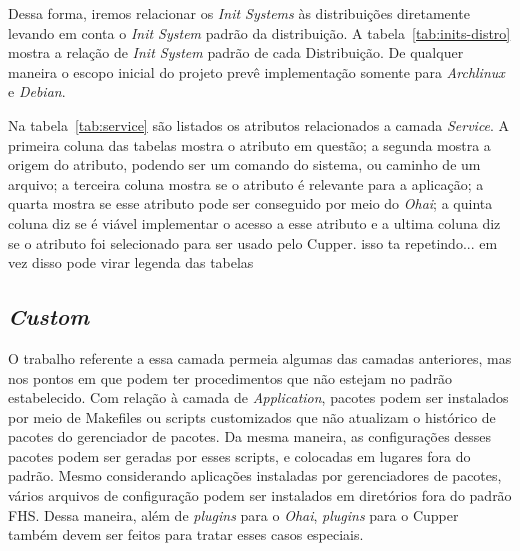 Dessa forma, iremos relacionar os \textit{Init Systems} às distribuições
diretamente levando em conta o \textit{Init System} padrão da distribuição.
A tabela~\ref{tab:inits-distro} mostra a relação de \textit{Init System} padrão de cada 
Distribuição. De qualquer maneira o escopo inicial do projeto prevê
implementação somente para \textit{Archlinux} e \textit{Debian}.


Na tabela~\ref{tab:service} são listados os atributos relacionados a camada 
\textit{Service}. A primeira coluna das tabelas mostra o atributo em questão; a segunda mostra
a origem do atributo, podendo ser um comando do sistema, ou caminho de um arquivo;
a terceira coluna mostra se o atributo é relevante para a aplicação; a quarta mostra se
esse atributo pode ser conseguido por meio do \textit{Ohai}; a quinta coluna 
diz se é viável implementar o acesso a esse atributo e a ultima coluna
diz se o atributo foi selecionado para ser usado pelo Cupper. {\color{red} isso ta repetindo... em vez disso pode virar legenda das tabelas}




\subsection{\textit{Custom}}
\label{sec:camada-custom}

O trabalho referente a essa camada permeia algumas das camadas anteriores, mas
nos pontos em que podem ter procedimentos que não estejam no padrão estabelecido.
Com relação à camada de \textit{Application}, pacotes podem ser instalados por
meio de Makefiles ou scripts customizados que não atualizam o histórico de
pacotes do gerenciador de pacotes. Da mesma maneira, as configurações desses
pacotes podem ser geradas por esses scripts, e colocadas em lugares fora do padrão.
Mesmo considerando aplicações instaladas por gerenciadores de pacotes, vários
arquivos de configuração podem ser instalados em diretórios fora  do padrão FHS.
Dessa maneira, além de \textit{plugins} para o \textit{Ohai}, \textit{plugins}
para o Cupper também devem ser feitos para tratar esses casos especiais.
